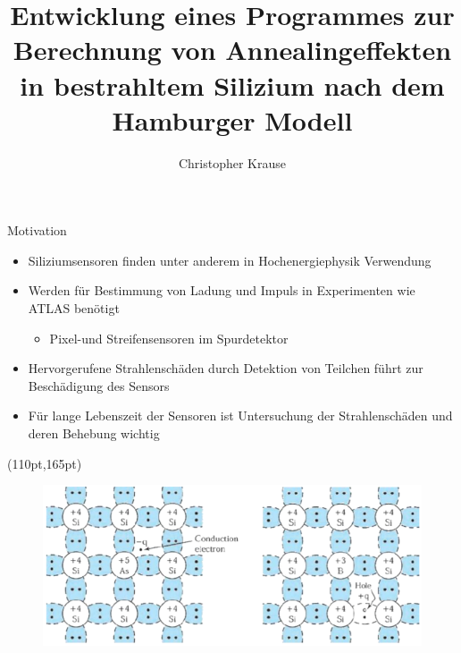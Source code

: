 \documentclass[aspectratio=43, 10pt]{beamer}
\title{\Large{Entwicklung eines Programmes zur Berechnung von Annealingeffekten in bestrahltem Silizium nach dem Hamburger Modell}}
\author[C.~Krause]{\normalsize{Christopher Krause}}
\institute[E4]{\normalsize{Experimentelle Physik IV} \\ \normalsize{Fakultät Physik}}
\begin{document}
\maketitle




\begin{frame}{Motivation}
  \vspace{-2cm}
  \begin{itemize}
    \item Siliziumsensoren finden unter anderem in Hochenergiephysik Verwendung
    \medskip
    \item Werden für Bestimmung von Ladung und Impuls in Experimenten wie ATLAS benötigt
      \begin{itemize}
        \item Pixel-und Streifensensoren im Spurdetektor
      \end{itemize}
    \medskip
    \item Hervorgerufene Strahlenschäden durch Detektion von Teilchen führt zur Beschädigung des Sensors

    \medskip
    \item Für lange Lebenszeit der Sensoren ist Untersuchung der Strahlenschäden und
          deren Behebung wichtig
  \end{itemize}
  \begin{textblock*}{8pt}(110pt,165pt)
  \begin{figure}
    \includegraphics[height=7.8\baselineskip]{images/struktur_2.png}
  \end{figure}
  \end{textblock*}
\end{frame}
\end{document}
